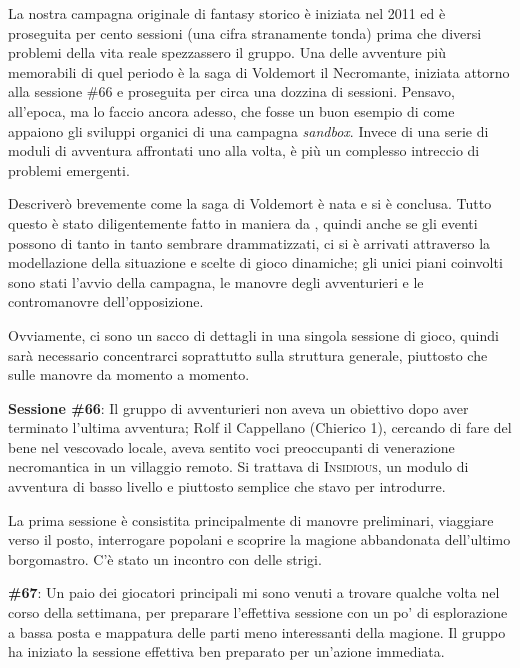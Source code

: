 
La nostra campagna originale di fantasy storico è iniziata nel 2011 ed è proseguita per cento sessioni (una cifra stranamente tonda) prima che diversi problemi della vita reale spezzassero il gruppo. Una delle avventure più memorabili di quel periodo è la saga di Voldemort il Necromante, iniziata attorno alla sessione \#66 e proseguita per circa una dozzina di sessioni. Pensavo, all'epoca, ma lo faccio ancora adesso, che fosse un buon esempio di come appaiono gli sviluppi organici di una campagna \textit{sandbox}. Invece di una serie di moduli di avventura affrontati uno alla volta, è più un complesso intreccio di problemi emergenti.

Descriverò brevemente come la saga di Voldemort è nata e si è conclusa. Tutto questo è stato diligentemente fatto in maniera da , quindi anche se gli eventi possono di tanto in tanto sembrare drammatizzati, ci si è arrivati attraverso la modellazione della situazione e scelte di gioco dinamiche; gli unici piani coinvolti sono stati l'avvio della campagna, le manovre degli avventurieri e le contromanovre dell'opposizione.

Ovviamente, ci sono un sacco di dettagli in una singola sessione di gioco, quindi sarà necessario concentrarci soprattutto sulla struttura generale, piuttosto che sulle manovre da momento a momento.

\textbf{Sessione \#66}: Il gruppo di avventurieri non aveva un obiettivo dopo aver terminato l'ultima avventura; Rolf il Cappellano (Chierico 1), cercando di fare del bene nel vescovado locale, aveva sentito voci preoccupanti di venerazione necromantica in un villaggio remoto. Si trattava di \textsc{Insidious}, un modulo di avventura di basso livello e piuttosto semplice che stavo per introdurre.

La prima sessione è consistita principalmente di manovre preliminari, viaggiare verso il posto, interrogare popolani e scoprire la magione abbandonata dell'ultimo borgomastro. C'è stato un incontro con delle strigi.

\textbf{\#67}: Un paio dei giocatori principali mi sono venuti a trovare qualche volta nel corso della settimana, per preparare l'effettiva sessione con un po' di esplorazione a bassa posta e mappatura delle parti meno interessanti della magione. Il gruppo ha iniziato la sessione effettiva ben preparato per un'azione immediata.

